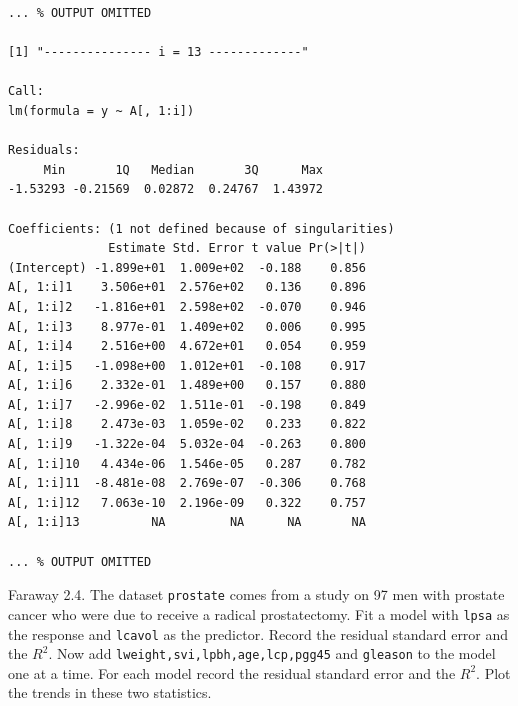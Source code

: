 \documentclass{homework}
\begin{document}
\begin{solution}
\begin{verbatim}
... % OUTPUT OMITTED

[1] "--------------- i = 13 -------------"

Call:
lm(formula = y ~ A[, 1:i])

Residuals:
     Min       1Q   Median       3Q      Max 
-1.53293 -0.21569  0.02872  0.24767  1.43972 

Coefficients: (1 not defined because of singularities)
              Estimate Std. Error t value Pr(>|t|)
(Intercept) -1.899e+01  1.009e+02  -0.188    0.856
A[, 1:i]1    3.506e+01  2.576e+02   0.136    0.896
A[, 1:i]2   -1.816e+01  2.598e+02  -0.070    0.946
A[, 1:i]3    8.977e-01  1.409e+02   0.006    0.995
A[, 1:i]4    2.516e+00  4.672e+01   0.054    0.959
A[, 1:i]5   -1.098e+00  1.012e+01  -0.108    0.917
A[, 1:i]6    2.332e-01  1.489e+00   0.157    0.880
A[, 1:i]7   -2.996e-02  1.511e-01  -0.198    0.849
A[, 1:i]8    2.473e-03  1.059e-02   0.233    0.822
A[, 1:i]9   -1.322e-04  5.032e-04  -0.263    0.800
A[, 1:i]10   4.434e-06  1.546e-05   0.287    0.782
A[, 1:i]11  -8.481e-08  2.769e-07  -0.306    0.768
A[, 1:i]12   7.063e-10  2.196e-09   0.322    0.757
A[, 1:i]13          NA         NA      NA       NA

... % OUTPUT OMITTED
\end{verbatim}

\end{solution}
\newpage

\begin{longproblem}
  Faraway 2.4. The dataset \texttt{prostate} comes from a study on 97 men with
  prostate cancer who were due to receive a radical prostatectomy.  Fit a model
  with \texttt{lpsa} as the response and \texttt{lcavol} as the predictor.
  Record the residual standard error and the $R^2$.  Now add
  \texttt{lweight,svi,lpbh,age,lcp,pgg45} and \texttt{gleason} to the model one
  at a time.  For each model record the residual standard error and the $R^2$.
  Plot the trends in these two statistics.
\end{longproblem}
\end{document}
